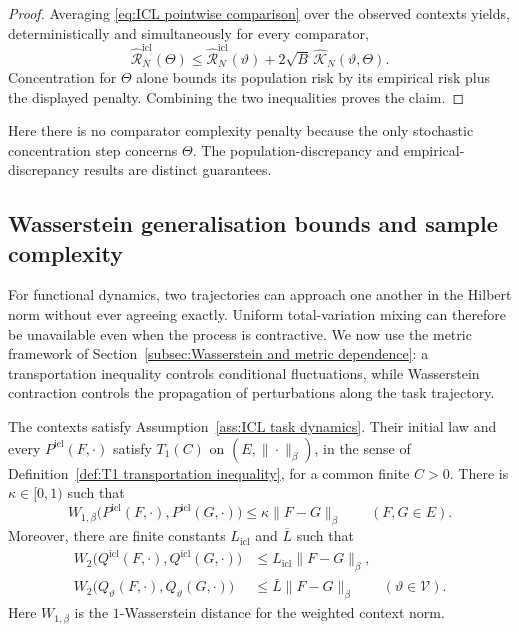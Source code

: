 \begin{proof}
Averaging \eqref{eq:ICL pointwise comparison} over the observed contexts yields, deterministically and simultaneously for every comparator,
\[
\widehat{\mathcal R}_N^{\mathrm{icl}}(\Theta)
\leqslant\widehat{\mathcal R}_N^{\mathrm{icl}}(\vartheta)
+2\sqrt B\,\widehat{\mathcal K}_N(\vartheta,\Theta).
\]
Concentration for \(\Theta\) alone bounds its population risk by its empirical risk plus the displayed penalty. Combining the two inequalities proves the claim.
\end{proof}

Here there is no comparator complexity penalty because the only stochastic concentration step concerns \(\Theta\). The population-discrepancy and empirical-discrepancy results are distinct guarantees.

\subsection{Wasserstein generalisation bounds and sample complexity}
\label{subsec:ICL Wasserstein bounds}

For functional dynamics, two trajectories can approach one another in the Hilbert norm without ever agreeing exactly. Uniform total-variation mixing can therefore be unavailable even when the process is contractive. We now use the metric framework of Section~\ref{subsec:Wasserstein and metric dependence}: a transportation inequality controls conditional fluctuations, while Wasserstein contraction controls the propagation of perturbations along the task trajectory.

\begin{assumption}
\label{ass:ICL metric assumptions}
The contexts satisfy Assumption~\ref{ass:ICL task dynamics}. Their initial law and every \(P^{\mathrm{icl}}(F,\cdot)\) satisfy \(T_1(C)\) on \((E,\|\cdot\|_\beta)\), in the sense of Definition~\ref{def:T1 transportation inequality}, for a common finite \(C>0\). There is \(\kappa\in[0,1)\) such that
\begin{equation}
\label{eq:ICL metric contraction}
W_{1,\beta}\bigl(P^{\mathrm{icl}}(F,\cdot),P^{\mathrm{icl}}(G,\cdot)\bigr)
\leqslant\kappa\|F-G\|_\beta
\qquad(F,G\in E).
\end{equation}
Moreover, there are finite constants \(L_{\mathrm{icl}}\) and \(\overline L\) such that
\begin{align}
W_2\bigl(Q^{\mathrm{icl}}(F,\cdot),Q^{\mathrm{icl}}(G,\cdot)\bigr)
&\leqslant L_{\mathrm{icl}}\|F-G\|_\beta,
\label{eq:ICL task Lipschitz}\\
W_2\bigl(Q_\vartheta(F,\cdot),Q_\vartheta(G,\cdot)\bigr)
&\leqslant\overline L\|F-G\|_\beta
\qquad(\vartheta\in\mathcal V).
\label{eq:ICL comparator Lipschitz}
\end{align}
Here \(W_{1,\beta}\) is the \(1\)-Wasserstein distance for the weighted context norm.
\end{assumption}

